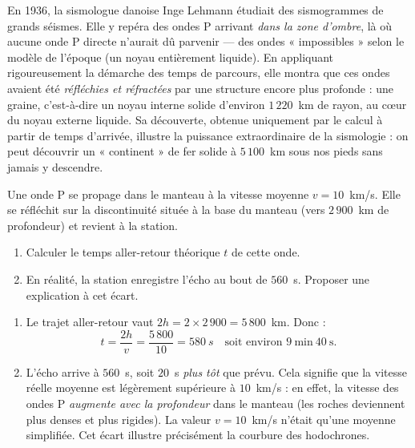 \documentclass[11pt]{article}
\newcommand{\cle}[1]{{\popxbold\color{popdark}#1}}
\begin{document}
\begin{savaistu}
En 1936, la sismologue danoise \cle{Inge Lehmann} étudiait des sismogrammes de grands séismes. Elle y repéra des ondes P arrivant \emph{dans la zone d'ombre}, là où aucune onde P directe n'aurait dû parvenir — des ondes « impossibles » selon le modèle de l'époque (un noyau entièrement liquide). En appliquant rigoureusement la démarche des temps de parcours, elle montra que ces ondes avaient été \emph{réfléchies et réfractées} par une structure encore plus profonde : une \cle{graine}, c'est-à-dire un \cle{noyau interne solide} d'environ $1\,220$~km de rayon, au cœur du noyau externe liquide. Sa découverte, obtenue uniquement par le calcul à partir de temps d'arrivée, illustre la puissance extraordinaire de la sismologie : on peut découvrir un « continent » de fer solide à $5\,100$~km sous nos pieds sans jamais y descendre.
\end{savaistu}

\begin{exercice}
Une onde P se propage dans le manteau à la vitesse moyenne $v = 10$~km/s. Elle se réfléchit sur la discontinuité située à la base du manteau (vers $2\,900$~km de profondeur) et revient à la station.
\begin{enumerate}
\item Calculer le temps aller-retour théorique $t$ de cette onde.
\item En réalité, la station enregistre l'écho au bout de $560$~s. Proposer une explication à cet écart.
\end{enumerate}
\end{exercice}

\begin{corrige}
\begin{enumerate}
\item Le trajet aller-retour vaut $2h = 2 \times 2\,900 = 5\,800$~km. Donc :
\[ t = \frac{2h}{v} = \frac{5\,800}{10} = 580~\si{s} \quad \text{soit environ } 9~\text{min}~40~\text{s}. \]
\item L'écho arrive à $560$~s, soit $20$~s \emph{plus tôt} que prévu. Cela signifie que la vitesse réelle moyenne est légèrement supérieure à $10$~km/s : en effet, la vitesse des ondes P \emph{augmente avec la profondeur} dans le manteau (les roches deviennent plus denses et plus rigides). La valeur $v = 10$~km/s n'était qu'une moyenne simplifiée. Cet écart illustre précisément la courbure des hodochrones.
\end{enumerate}
\end{corrige}
\end{document}
